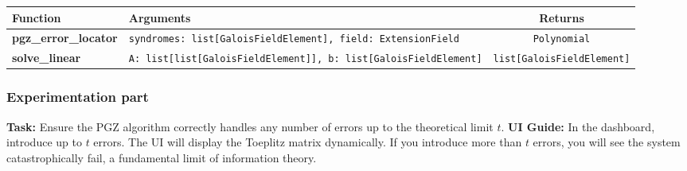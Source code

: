 \begin{center}
\renewcommand{\arraystretch}{1.5}
\begin{tabularx}{\textwidth}{@{} >{\bfseries}l X c @{}}
\toprule
Function & Arguments & Returns \\ \midrule
pgz\_error\_locator & \lstinline|syndromes: list[GaloisFieldElement], field: ExtensionField| & \lstinline|Polynomial| \\
solve\_linear & \lstinline|A: list[list[GaloisFieldElement]], b: list[GaloisFieldElement]| & \lstinline|list[GaloisFieldElement]| \\
\bottomrule
\end{tabularx}
\end{center}

\subsubsection*{Experimentation part}
\textbf{Task:} Ensure the PGZ algorithm correctly handles any number of errors up to the theoretical limit $t$.
\textbf{UI Guide:} In the dashboard, introduce up to $t$ errors. The UI will display the Toeplitz matrix dynamically. If you introduce more than $t$ errors, you will see the system catastrophically fail, a fundamental limit of information theory.

\vspace{1cm}

